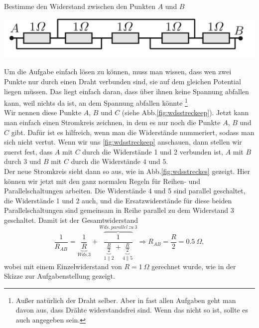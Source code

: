 \flushleft
\begin{minipage}{.57\textwidth}
\begin{Exercise}[label = wdsstrecke, title = Widerstandsstrecke, difficulty = 3, origin = IPhO 1996 ]
Bestimme den Widerstand zwischen den Punkten $A$ und $B$
	\end{Exercise}
\end{minipage}
\hfill
\begin{minipage}{.2\textwidth}
	\flushleft
	\includegraphics[scale = .2]{../tasks/ipho/wdsstrecke.png}
\end{minipage}
\begin{Answer}[ref = wdsstrecke]
	Um die Aufgabe einfach lösen zu können, muss man wissen, dass wen zwei Punkte nur durch einen Draht verbunden sind, sie auf dem gleichen Potential liegen müssen. Das liegt einfach daran, dass über ihnen keine Spannung abfallen kann, weil nichts da ist, an dem Spannung abfallen könnte \footnote{Außer natürlich der Draht selber. Aber in fast allen Aufgaben geht man davon aus, dass Drähte widerstandsfrei sind. Wenn das nicht so ist, sollte es auch angegeben sein.}\\
	Wir nennen diese Punkte $A$, $B$ und $C$ (siehe Abb.\ref{fig:wdsstreckeep}). Jetzt kann man einfach einen Stromkreis zeichnen, in dem es nur noch die Punkte $A$, $B$ und $C$ gibt. Dafür ist es hilfreich, wenn man die Widerstände nummeriert, sodass man sich nicht vertut. Wenn wir uns \ref{fig:wdsstreckeep} anschauen, dann stellen wir zuerst fest, dass $A$ mit $C$ durch die Widerstände 1 und 2 verbunden ist, $A$ mit $B$ durch 3 und $B$ mit $C$ durch die Widerstände $4$ und $5$. \\
	Der neue Stromkreis sieht dann so aus, wie in Abb.\ref{fig:wdsstreckes} gezeigt. Hier können wir jetzt mit den ganz normalen Regeln für Reihen- und Parallelschaltungen arbeiten. Die Widerstände 4 und 5 sind parallel geschaltet, die Widerstände 1 und 2 auch, und die Ersatzwiderstände für diese beiden Parallelschaltungen sind gemeinsam in Reihe parallel zu dem Widerstand 3 geschaltet.
	Damit ist der Gesamtwiderstand
	\begin{equation*}
		\boxed{
			\frac{1}{R_{AB}} =\underbrace{\frac{1}{R}}_{Wds. 3} + \overbrace{\frac{1}{\underbrace{\frac{R}{2}}_{1\parallel 2}+\underbrace{\frac{R}{2}}_{4\parallel 5}}}^{Wds.~parallel~zu~3} \Rightarrow R_{AB} = \frac{R}{2} = 0.5~\Omega,
			}
	\end{equation*}
	wobei mit einem Einzelwiderstand von $ R = 1~\Omega$ gerechnet wurde, wie in der Skizze zur Aufgabenstellung gezeigt.
\end{Answer}
